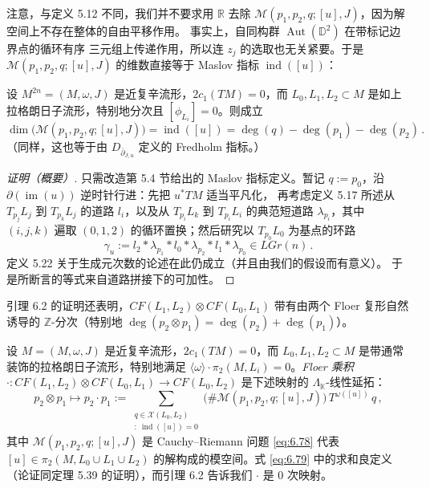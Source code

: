 注意，与定义 5.12 不同，我们并不要求用 $\mathbb R$ 去除
$\mathcal M(p_1,p_2,q;[u],J)$，因为解空间上不存在整体的自由平移作用。
事实上，自同构群 $\operatorname{Aut}(\mathbb D^2)$ 在带标记边界点的循环有序
三元组上传递作用，所以连 $z_j$ 的选取也无关紧要。于是
$\mathcal M(p_1,p_2,q;[u],J)$ 的维数直接等于 Maslov 指标
$\operatorname{ind}([u])$：

\begin{Lem}\label{lem:6.2}
设 $M^{2n}=(M,\omega,J)$ 是近复辛流形，$2c_1(TM)=0$，而
$L_0,L_1,L_2\subset M$ 是如上拉格朗日子流形，特别地分次且
$[\phi_{L_i}]=0$。则成立
\[
\dim\bigl(\mathcal M(p_1,p_2,q;[u],J)\bigr)
=\operatorname{ind}([u])=\deg(q)-\deg(p_1)-\deg(p_2)\,.
\]
（同样，这也等于由 $D_{\bar\partial_{J,u}}$ 定义的 Fredholm 指标。）
\end{Lem}

\begin{proof}[证明（概要）]
只需改造第 5.4 节给出的 Maslov 指标定义。暂记 $q:=p_0$，沿
$\partial(\operatorname{im}(u))$ 逆时针行进：先把 $u^*TM$ 适当平凡化，
再考虑定义 5.17 所述从 $T_{p_j}L_j$ 到 $T_{p_k}L_j$ 的道路 $l_i$，以及从
$T_{p_i}L_k$ 到 $T_{p_i}L_i$ 的典范短道路 $\lambda_{p_i}$，其中
$(i,j,k)$ 遍取 $(0,1,2)$ 的循环置换；然后研究以 $T_{p_0}L_0$ 为基点的环路
\[
\gamma_u:=l_2*\lambda_{p_1}*l_0*\lambda_{p_2}*l_1*\lambda_{p_0}
\in LGr(n)\,.
\]
定义 5.22 关于生成元次数的论述在此仍成立（并且由我们的假设而有意义）。
于是所断言的等式来自道路拼接下的可加性。
\end{proof}



引理 6.2 的证明还表明，$CF(L_1,L_2)\otimes CF(L_0,L_1)$ 带有由两个 Floer
复形自然诱导的 $\mathbb Z$-分次（特别地
$\deg(p_2\otimes p_1)=\deg(p_2)+\deg(p_1)$）。

\begin{Def}\label{def:6.3}
设 $M=(M,\omega,J)$ 是近复辛流形，$2c_1(TM)=0$，而
$L_0,L_1,L_2\subset M$ 是带通常装饰的拉格朗日子流形，特别地满足
$\langle\omega\rangle\cdot\pi_2(M,L_i)=0$。\emph{Floer 乘积}
$\cdot:CF(L_1,L_2)\otimes CF(L_0,L_1)\to CF(L_0,L_2)$ 是下述映射的
$\Lambda_{\mathbb K}$-线性延拓：
\begin{equation}
p_2\otimes p_1\longmapsto p_2\cdot p_1
:=\sum_{\substack{q\in\mathcal X(L_0,L_2)\\ [u]:\ \operatorname{ind}([u])=0}}
\bigl(\#\mathcal M(p_1,p_2,q;[u],J)\bigr)\,T^{\omega([u])}\,q\,,
\label{eq:6.79}
\end{equation}
其中 $\mathcal M(p_1,p_2,q;[u],J)$ 是 Cauchy--Riemann 问题 \eqref{eq:6.78}
代表 $[u]\in\pi_2(M,L_0\cup L_1\cup L_2)$ 的解构成的模空间。式
\eqref{eq:6.79} 中的求和良定义（论证同定理 5.39 的证明），而引理 6.2
告诉我们 $\cdot$ 是 $0$ 次映射。
\end{Def}

